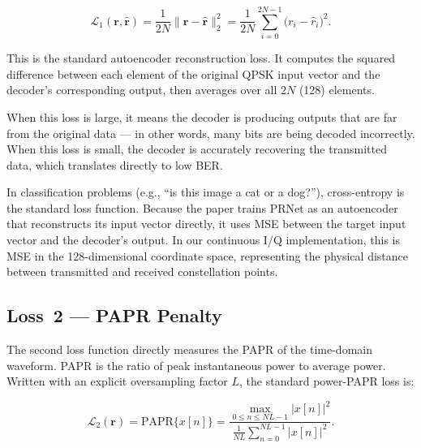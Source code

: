 \begin{keyresult}
    \begin{equation}
        \mathcal{L}_1(\bm{r},\hat{\bm{r}})
        = \frac{1}{2N}\|\bm{r} - \hat{\bm{r}}\|_2^2
        = \frac{1}{2N}\sum_{i=0}^{2N-1}\bigl(r_i - \hat{r}_i\bigr)^2.
    \end{equation}
\end{keyresult}

This is the standard autoencoder reconstruction loss.  It computes the squared difference between each element of the original QPSK input vector and the decoder's corresponding output, then averages over all $2N$ (128) elements.

When this loss is large, it means the decoder is producing outputs that are far from the original data --- in other words, many bits are being decoded incorrectly.  When this loss is small, the decoder is accurately recovering the transmitted data, which translates directly to low BER.

\begin{keyinsight}
    In classification problems (e.g., ``is this image a cat or a dog?''), cross-entropy is the standard loss function. Because the paper trains PRNet as an autoencoder that reconstructs its input vector directly, it uses MSE between the target input vector and the decoder's output. In our continuous I/Q implementation, this is MSE in the 128-dimensional coordinate space, representing the physical distance between transmitted and received constellation points.
\end{keyinsight}

\subsection{Loss~2 --- PAPR Penalty}

The second loss function directly measures the PAPR of the time-domain waveform.  PAPR is the ratio of peak instantaneous power to average power. Written with an explicit oversampling factor $L$, the standard power-PAPR loss is:

\begin{keyresult}
    \begin{equation}
        \mathcal{L}_2(\bm{r})
        = \mathrm{PAPR}\{x[n]\}
        = \frac{\displaystyle\max_{0 \le n \le NL-1} |x[n]|^2}
        {\displaystyle\frac{1}{NL}\sum_{n=0}^{NL-1}|x[n]|^2}.
    \end{equation}
\end{keyresult}

